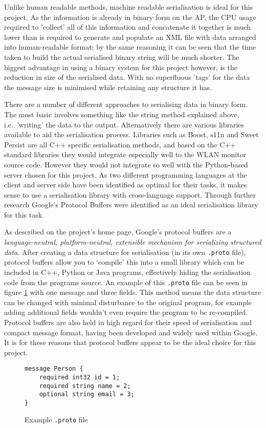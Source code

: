     Unlike human readable methods, machine readable serialisation is ideal for this project. As the information is already in binary form on the AP, the CPU usage required to 'collect' all of this information and concatenate it together is much lower than is required to generate and populate an XML file with data arranged into human-readable format; by the same reasoning it can be seen that the time taken to build the actual serialised binary string will be much shorter. The biggest advantage in using a binary system for this project however, is the reduction in size of the serialised data. With no superfluous 'tags' for the data the message size is minimised while retaining any structure it has.

    There are a number of different approaches to serialising data in binary form. The most basic involves something like the string method explained above, i.e.\ 'writing' the data to the output. Alternatively there are various libraries available to aid the serialisation process. Libraries such as Boost\cite{ramey-boost}, s11n\cite{beal-s11n} and Sweet Persist\cite{entry-4} are all C++ specific serialisation methods, and based on the C++ standard libraries they would integrate especially well to the WLAN monitor source code. However they would not integrate so well with the Python-based server chosen for this project. As two different programming languages at the client and server side have been identified as optimal for their tasks, it makes sense to use a serialisation library with cross-language support. Through further research Google's Protocol Buffers\cite{Goo} were identified as an ideal serialisation library for this task.

    As described on the project's home page, Google's protocol buffers are a \textit{language-neutral, platform-neutral, extensible mechanism for serializing structured data}\cite{Goo}. After creating a data structure for  serialisation (in its own \texttt{.proto} file), protocol buffers allow you to `compile' this into a small library which can be included in C++, Python or Java programs, effectively hiding the serialisation code from the programs source. An example of this \texttt{.proto} file can be seen in figure \ref{fig:protofile} with one message and three fields. This method means the data structure can be changed with minimal disturbance to the original program, for example adding additional fields wouldn't even require the program to be re-compiled. Protocol buffers are also held in high regard for their speed of serialisation and compact message format, having been developed and widely used within Google\cite{1629198}. It is for these reasons that protocol buffers appear to be the ideal choice for this project.
    \begin{figure}[H]
      \centering
      \begin{lstlisting}
message Person {
    required int32 id = 1;
    required string name = 2;
    optional string email = 3;
}
      \end{lstlisting}
      \caption{Example \texttt{.proto} file}
      \label{fig:protofile}
    \end{figure}
